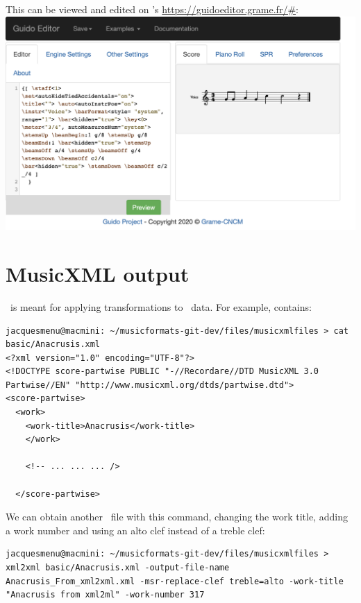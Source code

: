 This can be viewed and edited on \fober 's \url{https://guidoeditor.grame.fr/#}:\\
\includegraphics[scale=0.7]{../graphics/Anacrusis_Guido.png}


\section{MusicXML output}

\xmlToXml\ is meant for applying transformations to \mxml\ data. For example,  contains:
\begin{lstlisting}[language=Terminal]
jacquesmenu@macmini: ~/musicformats-git-dev/files/musicxmlfiles > cat basic/Anacrusis.xml
<?xml version="1.0" encoding="UTF-8"?>
<!DOCTYPE score-partwise PUBLIC "-//Recordare//DTD MusicXML 3.0 Partwise//EN" "http://www.musicxml.org/dtds/partwise.dtd">
<score-partwise>
  <work>
    <work-title>Anacrusis</work-title>
    </work>

	<!-- ... ... ... />
	
  </score-partwise>
\end{lstlisting}

We can obtain another \mxml\ file with this command, changing the work title, adding a work number and using an alto clef instead of a treble clef:
\begin{lstlisting}[language=Terminal]
jacquesmenu@macmini: ~/musicformats-git-dev/files/musicxmlfiles >  xml2xml basic/Anacrusis.xml -output-file-name Anacrusis_From_xml2xml.xml -msr-replace-clef treble=alto -work-title "Anacrusis from xml2ml" -work-number 317
\end{lstlisting}

